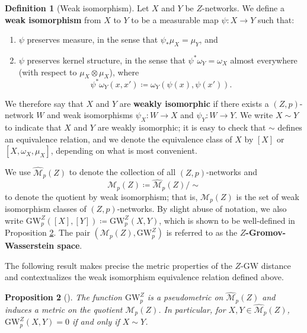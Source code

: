 \documentclass{article}
\newtheorem{proposition}{Proposition}[section]
\theoremstyle{definition}
\newtheorem{definition}[proposition]{Definition}
\newcommand{\M}{\mathcal{M}}
\newcommand{\MZpNoSim}{\widehat{\M}_p(Z)}
\newcommand{\MZp}{\M_p(Z)}
\newcommand{\dgwz}{\mathrm{GW}_p^Z}
\begin{document}
\begin{definition}[Weak isomorphism]\label{def:weak_iso}
Let $X$ and $Y$ be $Z$-networks. We define a \textbf{weak isomorphism} from $X$ to $Y$ to be a measurable map $\psi:X \to Y$ such that:
\begin{enumerate}
    \item $\psi$ preserves measure, in the sense that $\psi_\ast \mu_X = \mu_Y$, and
    \item $\psi$ preserves kernel structure, in the sense that $\psi^\ast \omega_Y = \omega_X$ almost everywhere (with respect to $\mu_X\otimes \mu_X$), where
    \[
    \psi^\ast \omega_Y(x,x') \coloneqq \omega_Y(\psi(x),\psi(x')).
    \]
\end{enumerate}
We therefore say that $X$ and $Y$ are \textbf{weakly isomorphic} if there exists a $(Z,p)$-network $W$ and weak isomorphisms $\psi_X:W \to X$ and $\psi_Y:W \to Y$. We write $X\sim Y$ to indicate that $X$ and $Y$ are weakly isomorphic; it is easy to check that $\sim$ defines an equivalence relation, and we denote the equivalence class of $X$ by $[X]$ or $[X,\omega_X,\mu_X]$, depending on what is most convenient.

We use $\MZpNoSim$ to denote the collection of all $(Z,p)$-networks and
\[
\MZp \coloneqq \MZpNoSim/\!\sim
\]
to denote the quotient by weak isomorphism; that is, $\MZp$ is the set of weak isomorphism classes of $(Z,p)$-networks.
By slight abuse of notation, we also write $\dgwz([X],[Y])\coloneqq\dgwz(X,Y)$, which is shown to be well-defined in Proposition \ref{prop:metric_properties}. The pair $(\MZp,\dgwz)$ is referred to as the \textbf{$Z$-Gromov-Wasserstein space}.
\end{definition}


The following result makes precise the metric properties of the $Z$-GW distance and contextualizes the weak isomorphism equivalence relation defined above. 

\begin{proposition}[{\cite[Theorem 29]{bauer2025zgromovwassersteindistance}}]\label{prop:metric_properties}
    The function $\dgwz$ is a pseudometric on $\MZpNoSim$ and induces a metric on the quotient $\MZp$. In particular, for $X,Y \in \MZpNoSim$, $\dgwz(X,Y) = 0$ if and only if $X \sim Y$. 
\end{proposition}
\end{document}
